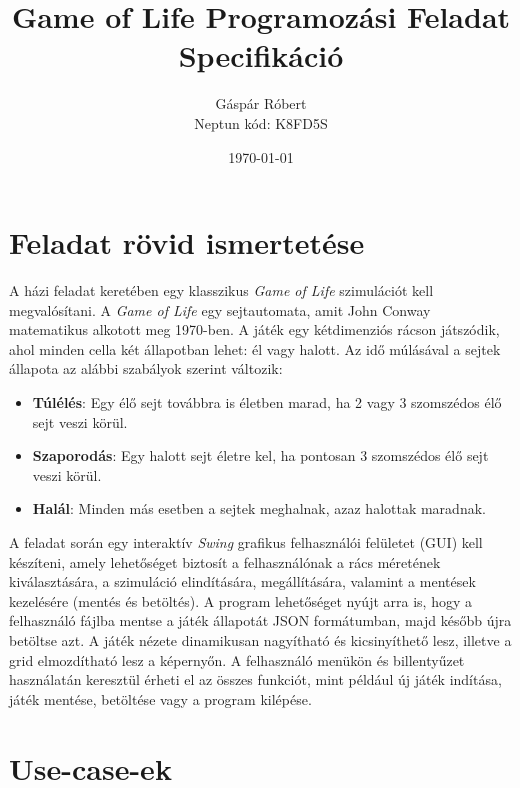 \documentclass[a4paper,12pt]{article}
\title{Game of Life Programozási Feladat Specifikáció}
\author{Gáspár Róbert \\ Neptun kód: K8FD5S}
\date{\today}
\begin{document}
\maketitle

\section*{Feladat rövid ismertetése}

A házi feladat keretében egy klasszikus \textit{Game of Life} szimulációt kell megvalósítani. A \textit{Game of Life} egy sejtautomata, amit John Conway matematikus alkotott meg 1970-ben. A játék egy kétdimenziós rácson játszódik, ahol minden cella két állapotban lehet: él vagy halott. Az idő múlásával a sejtek állapota az alábbi szabályok szerint változik:

\begin{itemize}
    \item \textbf{Túlélés}: Egy élő sejt továbbra is életben marad, ha 2 vagy 3 szomszédos élő sejt veszi körül.
    \item \textbf{Szaporodás}: Egy halott sejt életre kel, ha pontosan 3 szomszédos élő sejt veszi körül.
    \item \textbf{Halál}: Minden más esetben a sejtek meghalnak, azaz halottak maradnak.
\end{itemize}

A feladat során egy interaktív \textit{Swing} grafikus felhasználói felületet (GUI) kell készíteni, amely lehetőséget biztosít a felhasználónak a rács méretének kiválasztására, a szimuláció elindítására, megállítására, valamint a mentések kezelésére (mentés és betöltés). A program lehetőséget nyújt arra is, hogy a felhasználó fájlba mentse a játék állapotát JSON formátumban, majd később újra betöltse azt. A játék nézete dinamikusan nagyítható és kicsinyíthető lesz, illetve a grid elmozdítható lesz a képernyőn. A felhasználó menükön és billentyűzet használatán keresztül érheti el az összes funkciót, mint például új játék indítása, játék mentése, betöltése vagy a program kilépése.

\section*{Use-case-ek}
\end{document}
